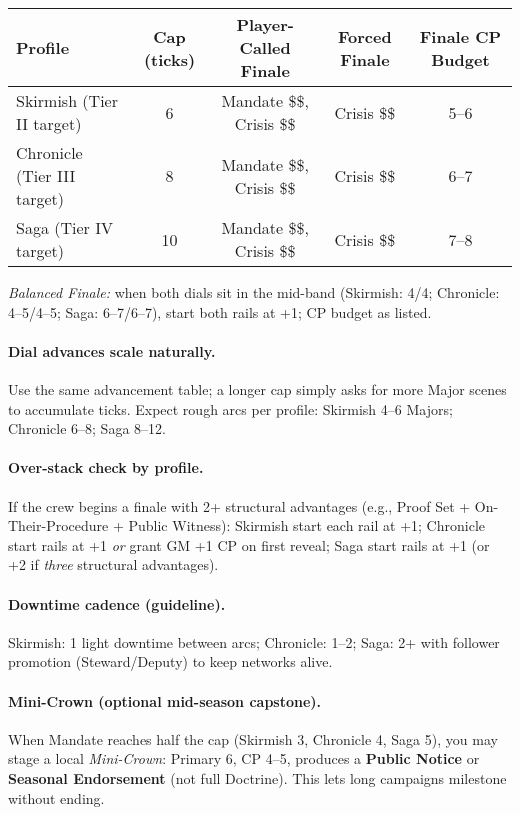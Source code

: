 \documentclass[12pt]{book}
\begin{document}
\begin{center}
\begin{tabular}{@{}l c c c c@{}}
\toprule
\textbf{Profile} & \textbf{Cap (ticks)} & \textbf{Player-Called Finale} & \textbf{Forced Finale} & \textbf{Finale CP Budget} \\
\midrule
Skirmish (Tier II target) & 6 & Mandate \$\ge 5\$, Crisis \$\le 3\$ & Crisis \$\ge 5\$ & 5--6 \\
Chronicle (Tier III target) & 8 & Mandate \$\ge 6\$, Crisis \$\le 3\$ & Crisis \$\ge 6\$ & 6--7 \\
Saga (Tier IV target) & 10 & Mandate \$\ge 8\$, Crisis \$\le 4\$ & Crisis \$\ge 8\$ & 7--8 \n\bottomrule
\end{tabular}
\end{center}

\noindent \textit{Balanced Finale:} when both dials sit in the mid-band (Skirmish: 4/4; Chronicle: 4--5/4--5; Saga: 6--7/6--7), start both rails at +1; CP budget as listed.

\paragraph{Dial advances scale naturally.} Use the same advancement table; a longer cap simply asks for more Major scenes to accumulate ticks. Expect rough arcs per profile: Skirmish 4--6 Majors; Chronicle 6--8; Saga 8--12.

\paragraph{Over-stack check by profile.} If the crew begins a finale with 2+ structural advantages (e.g., Proof Set + On-Their-Procedure + Public Witness): Skirmish start each rail at +1; Chronicle start rails at +1 \emph{or} grant GM +1 CP on first \spadesuit{} reveal; Saga start rails at +1 (or +2 if \emph{three} structural advantages).

\paragraph{Downtime cadence (guideline).} Skirmish: 1 light downtime between arcs; Chronicle: 1--2; Saga: 2+ with follower promotion (Steward/Deputy) to keep networks alive.

\paragraph{Mini-Crown (optional mid-season capstone).} When Mandate reaches half the cap (Skirmish 3, Chronicle 4, Saga 5), you may stage a local \emph{Mini-Crown}: Primary 6, CP 4--5, produces a \textbf{Public Notice} or \textbf{Seasonal Endorsement} (not full Doctrine). This lets long campaigns milestone without ending.
\end{document}
